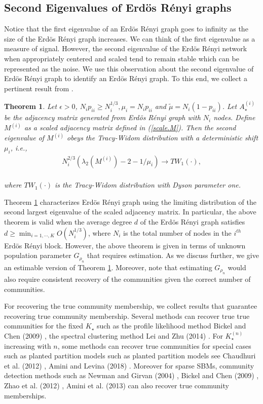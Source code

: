 \documentclass[11pt]{article}
\newtheorem{theorem}{Theorem}[section]
\newcommand{\be}{\begin{eqnarray}}
\newcommand{\ee}{\end{eqnarray}}
\begin{document}
\subsection{Second Eigenvalues of Erd\"{o}s R\'{e}nyi graphs} Notice that the first eigenvalue of an Erd\"{o}s R\'{e}nyi graph goes to infinity as the size of the Erd\"{o}s R\'{e}nyi graph increases. We can think of the first eigenvalue as a measure of signal. However, the second eigenvalue of the Erd\"{o}s R\'{e}nyi network when appropriately centered and scaled tend to remain stable which can be represented as the noise. We use this observation about the second eigenvalue of Erd\"{o}s R\'{e}nyi graph to identify an Erd\"{o}s R\'{e}nyi graph. To this end, we collect a pertinent result from \cite{leeTWCov16}.

\begin{theorem}\label{TW.thm}
Let $\epsilon > 0$, $N_i p_{ii} \ge N_i^{1/3}, \mu_i = N_i p_{ii}$ and $\tilde{\mu} = N_i (1 - p_{ii})$. Let $A^{(i)}_{\star}$ be the adjacency matrix generated from Erd\"{o}s R\'{e}nyi graph with $N_i$ nodes. Define $M^{(i)}$ as a scaled adjacency matrix defined in (\ref{scale.M}). Then the second eigenvalue of $M^{(i)}$ obeys the \emph{Tracy-Widom} distribution with a deterministic shift $\mu_i$, i.e., \\

\be\label{TW}
N_i^{2/3} (\lambda_2(M^{(i)}) - 2 -1/\mu_i) \to TW_1(\cdot),
\ee\\

where $TW_1(\cdot)$ is the Tracy-Widom distribution with Dyson parameter one.
\end{theorem}

Theorem \ref{TW.thm} characterizes Erd\"{o}s R\'{e}nyi graph using the limiting distribution of the second largest eigenvalue of the scaled adjacency matrix. In particular, the above theorem is valid when the average degree $d$ of the Erd\"{o}s R\'{e}nyi graph satisfies $d \ge \min_{i=1, \cdots, K} O(N_i^{1/3})$, where $N_i$ is the total number of nodes in the $i^{th}$ Erd\"{o}s R\'{e}nyi block. However, the above theorem is given in terms of unknown population parameter $G_{\rho_n}$ that requires estimation. As we discuss further, we give an estimable version of Theorem \ref{TW.thm}. Moreover, note that estimating $G_{\rho_n}$ would also require consistent recovery of the communities given the correct number of communities.

For recovering the true community membership, we collect results that guarantee recovering true community membership. Several methods can recover true true communities for the fixed $K_{\star}$ such as the profile likelihood method Bickel and Chen (2009) \cite{bickel09}, the spectral clustering method Lei and Zhu (2014) \cite{lei2014}. For $K_{\star}^{(n)}$ increasing with $n$, some methods can recover true communities for special cases such as planted partition models such as planted partition models see Chaudhuri et al. (2012) \cite{chaudhuri2012}, Amini and Levina (2018) \cite{amini2018}. Moreover for sparse SBMs, community detection methods such as Newman and Girvan (2004) \cite{newman04}, Bickel and Chen (2009) \cite{bickel09}, Zhao et al. (2012) \cite{zhao12}, Amini et al. (2013) \cite{amini2013} can also recover true community memberships.
\end{document}
